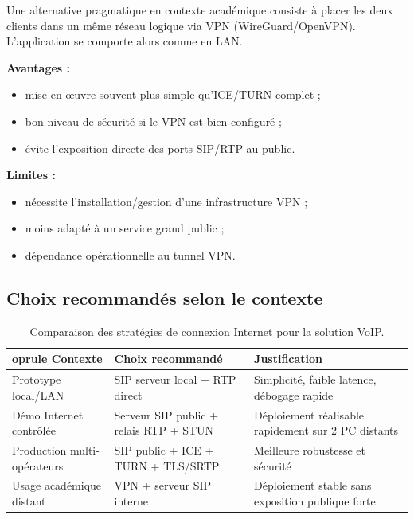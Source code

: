 \documentclass[12pt,a4paper]{article}
\begin{document}
Une alternative pragmatique en contexte académique consiste à placer les deux clients dans un même réseau logique via VPN (WireGuard/OpenVPN). L'application se comporte alors comme en LAN.

	\textbf{Avantages :}
\begin{itemize}[leftmargin=1.2cm]
    \item mise en œuvre souvent plus simple qu'ICE/TURN complet ;
    \item bon niveau de sécurité si le VPN est bien configuré ;
    \item évite l'exposition directe des ports SIP/RTP au public.
\end{itemize}

	\textbf{Limites :}
\begin{itemize}[leftmargin=1.2cm]
    \item nécessite l'installation/gestion d'une infrastructure VPN ;
    \item moins adapté à un service grand public ;
    \item dépendance opérationnelle au tunnel VPN.
\end{itemize}

\subsection{Choix recommandés selon le contexte}

\begin{table}[H]
\centering
\begin{tabular}{p{4.3cm}p{5.2cm}p{4.5cm}}

    oprule
	\textbf{Contexte} & \textbf{Choix recommandé} & \textbf{Justification} \\
\midrule
Prototype local/LAN & SIP serveur local + RTP direct & Simplicité, faible latence, débogage rapide \\
\midrule
Démo Internet contrôlée & Serveur SIP public + relais RTP + STUN & Déploiement réalisable rapidement sur 2 PC distants \\
\midrule
Production multi-opérateurs & SIP public + ICE + TURN + TLS/SRTP & Meilleure robustesse et sécurité \\
\midrule
Usage académique distant & VPN + serveur SIP interne & Déploiement stable sans exposition publique forte \\
\bottomrule
\end{tabular}
\caption{Comparaison des stratégies de connexion Internet pour la solution VoIP.}
\end{table}
\end{document}
